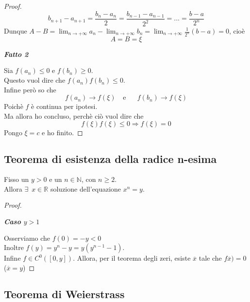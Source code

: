 \documentclass{article}
\theoremstyle{definition}
\begin{document}
\begin{proof}
\begin{equation}
    b_{n+1}-a_{n+1}=\frac{b_n-a_n}{2}=\frac{b_{n-1}-a_{n-1}}{2^2}=...=\frac{b-a}{2^n}
\end{equation}
Dunque $A-B=\lim_{n\to +\infty}a_n-\lim_{n\to +\infty}b_n=\lim_{n\to +\infty}\frac{1}{2^n}(b-a)=0$, cioè
\begin{equation}
    A=B=\xi
\end{equation}
\begin{center}
    \textbf{\textit{Fatto 2}}
\end{center}
Sia $f(a_n) \leqslant 0$ e $f(b_n) \geqslant 0$.
\\
Questo vuol dire che $f(a_n)f(b_n) \leqslant 0$.
\\
Infine però so che \begin{equation}
    f(a_n) \to f(\xi) \,\,\,\,\,\ \mbox{e}\,\,\,\,\,\,\,\,\,\, f(b_n) \to f(\xi)
\end{equation}
Poichè $f$ è continua per ipotesi.
\\
Ma allora ho concluso, perchè ciò vuol dire che
\begin{equation}
    f(\xi)f(\xi) \leqslant 0 \Longrightarrow f(\xi) = 0
\end{equation}
Pongo $\xi=c$ e ho finito.
\end{proof}
\subsection{Teorema di esistenza della radice n-esima}
Fisso un $y>0$ e un $n \in \mathbb{N}$, con $n \geqslant 2$.
\\
Allora $\exists \,\,\, x \in \mathbb{R}$ soluzione dell'equazione $x^n=y$.
\\
\begin{proof}
\begin{center}
    \textbf{\textit{Caso $y>1$}}
    \end{center}
    Osserviamo che $f(0)=-y <0$
    \\
    Inoltre $f(y)=y^n-y=y(y^{n-1}-1)$.
    \\
    Infine $f \in C^0([0,y])$. Allora, per il teorema degli zeri, esiste $\overline{x}$ tale che $f\overline{x})=0$ ($\overline{x}=y$)
\end{proof}
\subsection{Teorema di Weierstrass}
\end{document}

